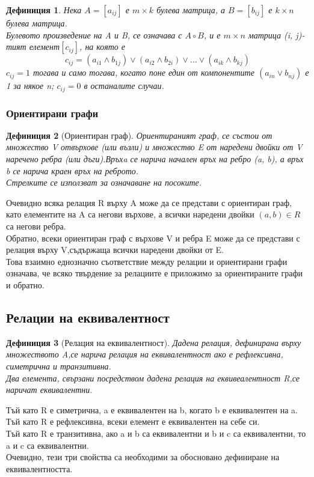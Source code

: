 \documentclass[fleqn, 12pt]{article}
\newtheorem{definition}{Дефиниция}[subsection]
\theoremstyle{definition}
\begin{document}
\begin{definition}
Нека $A = [a_{ij}]$ е $m \times k$ булева матрица, а $B = [b_{ij}]$ е $k \times n$ булева матрица.\\
Булевото произведение на A и B, се означава с $A \circ B$, и е $m\times n$ матрица (i, j)-тият елемент$[c_{ij}]$, на която е 
$$c_{ij}= (a_{i1}\land b_{1j}) \lor (a_{i2}\land b_{2i}) \lor ... \lor (a_{ik} \land b_{kj})$$
$c_{ij} = 1$ тогава и само тогава, когато поне един от компонентите $(a_{in}\lor b_{nj})$ е 1 за някое n; $c_{ij}= 0$ в останалите случаи.
\end{definition}

\subsubsection{Ориентирани графи}

\begin{definition}[Ориентиран граф]
Ориентираният граф, се състои от множество V отвърхове (или възли) и множество E от наредени двойки от V наречено ребра (или дъги).Връхa се нарича начален връх на ребро (a, b), а връх b се нарича краен връх на реброто. \\
Стрелките се използват за означаване на посоките.
\end{definition}
Очевидно всяка релация R върху A може да се представи с ориентиран граф, като елементите на A са негови върхове, а всички наредени двойки $(a, b) \in R$ са негови ребра.\\
Обратно, всеки ориентиран граф с върхове V и ребра E може да се представи с релация върху V,съдържаща всички наредени двойки от E.\\
Това взаимно еднозначно съответствие между релации и ориентирани графи означава, че всяко твърдение за релациите е приложимо за ориентираните графи и обратно.

\subsection{Релации на еквивалентност}

\begin{definition}[Релация на еквивалентност]
Дадена релация, дефинирана върху множеството A,се нарича релация на еквивалентност ако е рефлексивна, симетрична и транзитивна. \\
Два елемента, свързани посредством дадена релация на еквивеалентност R,се наричат еквивалентни.
\end{definition}
Тъй като R е симетрична, a е еквивалентен на b, когато b е еквивалентен на a.\\
Тъй като R е рефлексивна, всеки елемент е еквивалентен на себе си.\\
Тъй като R е транзитивна, ако a и b са еквивалентни и b и c са еквивалентни, то a и c са еквивалентни.\\
Очевидно, тези три свойства са необходими за обосновано дефиниране на еквивалентността.
\end{document}
